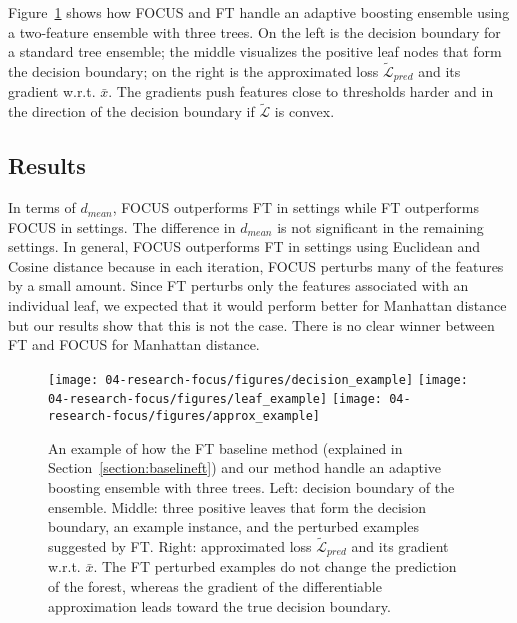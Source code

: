 Figure~\ref{fig:approxensemble} shows how FOCUS and FT handle an adaptive boosting ensemble using a two-feature ensemble with three trees. 
On the left is the decision boundary for a standard tree ensemble; the middle visualizes the positive leaf nodes that form the decision boundary; on the right is the approximated loss $\widetilde{\mathcal{L}}_{pred}$ and its gradient w.r.t. $\bar{x}$.
The gradients push features close to thresholds harder and in the direction of the decision boundary if $\widetilde{\mathcal{L}}$ is convex. 


\subsection{Results}
In terms of $d_\mathit{mean}$, FOCUS outperforms FT in  settings while FT outperforms FOCUS in  settings. The difference in $d_\mathit{mean}$ is not significant in the remaining  settings. 
In general, FOCUS outperforms FT in settings using Euclidean and Cosine distance because in each iteration, FOCUS perturbs many of the features by a small amount. 
Since FT perturbs only the features associated with an individual leaf, we expected that it would perform better for Manhattan distance but our results show that this is not the case. 
There is no clear winner between FT and FOCUS for Manhattan distance. 

\begin{figure}[t]
\centering
\texttt{[image: 04-research-focus/figures/decision\_example]} 
\texttt{[image: 04-research-focus/figures/leaf\_example]} 
\texttt{[image: 04-research-focus/figures/approx\_example]}
\caption{
An example of how the FT baseline method (explained in Section~\ref{section:baselineft}) and our method handle an adaptive boosting ensemble with three trees.
Left: decision boundary of the ensemble.
Middle: three positive leaves that form the decision boundary, an example instance, and the perturbed examples suggested by \acs{FT}. 
Right: approximated loss $\widetilde{\mathcal{L}}_{pred}$ and its gradient w.r.t. $\bar{x}$. 
The \acs{FT} perturbed examples do not change the prediction of the forest, whereas the gradient of the differentiable approximation leads toward the true decision boundary.
}
\label{fig:approxensemble}
\end{figure}



\begin{landscape}
\begin{table}
\caption{Evaluation results for Experiment 1 comparing FOCUS and FT counterfactual examples. Significant improvements and losses over the baseline (FT) are denoted by \dubbelneer\ and \dubbelop, respectively ($p < 0.05$, two-tailed t-test,); 
\notsig{} denotes no significant difference;
\NoExample{} denotes settings where the baseline cannot find a counterfactual example for every instance.}

\label{table:distances}
\end{table}
\end{landscape}


